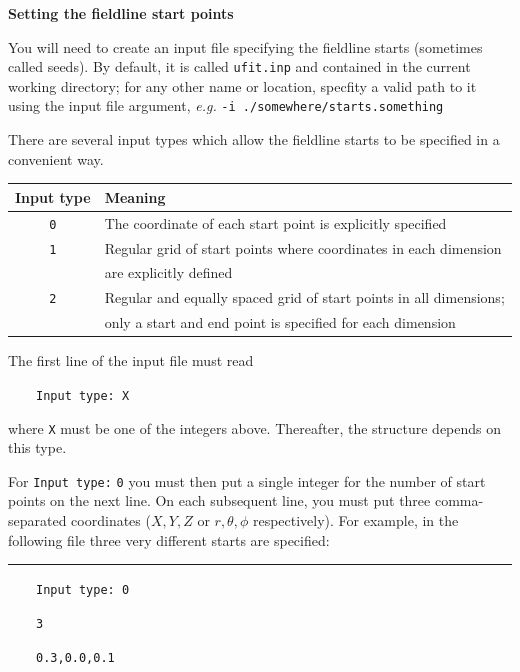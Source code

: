 \documentclass[12pt,twoside]{article}
\begin{document}
\vspace{2mm}
{\Large \textbf{Setting the fieldline start points}}

You will need to create an input file specifying the fieldline starts (sometimes called seeds). By default, it is called \texttt{ufit.inp} and contained in the current working directory; for any other name or location, specfity a valid path to it using the input file argument, \textit{e.g.} \texttt{-i ./somewhere/starts.something}

There are several input types which allow the fieldline starts to be specified in a convenient way.

\vspace{2mm}

\begin{tabular}{|c|l|}		
		\hline
		\textbf{Input type} & \textbf{Meaning} \\\hline\hline
		\texttt{0} & The coordinate of each start point is explicitly specified \\\hline
		\texttt{1} & Regular grid of start points where coordinates in each dimension  \\
		           & are explicitly defined  \\\hline
		\texttt{2} & Regular and equally spaced grid of start points in all dimensions; \\
		           & only a start and end point is specified for each dimension \\\hline
\end{tabular}

\vspace{2mm}

The first line of the input file must read 

$\quad\quad$\texttt{Input type: X}

where \texttt{X} must be one of the integers above. Thereafter, the structure depends on this type.

For \texttt{Input type:} \texttt{0} you must then put a single integer for the number of start points on the next line. On each subsequent line, you must put three comma-separated coordinates ($X,Y,Z$ or $r,\theta,\phi$ respectively). For example, in the following file three very different starts are specified:

\noindent\rule{\linewidth}{0.4pt}

$\quad\quad$\texttt{Input type: 0}

$\quad\quad$\texttt{3}

$\quad\quad$\texttt{0.3,0.0,0.1}
\end{document}
